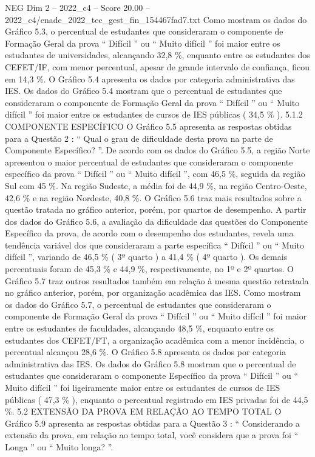 \begin{textsample}{NEG Dim 2 – 2022\_c4 – Score 20.00 – 2022\_c4/enade\_2022\_tec\_gest\_fin\_154467fad7.txt}
Como mostram os dados do Gráfico 5.3, o percentual de estudantes que consideraram o componente de Formação Geral da prova “ Difícil ” ou “ Muito difícil ” foi maior entre os estudantes de universidades, alcançando 32,8 \%, enquanto entre os estudantes dos CEFET/IF, com menor percentual, apesar de grande intervalo de confiança, ficou em 14,3 \%.
O Gráfico 5.4 apresenta os dados por categoria administrativa das IES.
Os dados do Gráfico 5.4 mostram que o percentual de estudantes que consideraram o componente de Formação Geral da prova “ Difícil ” ou “ Muito difícil ” foi maior entre os estudantes de cursos de IES públicas ( 34,5 \% ). 5.1.2 COMPONENTE ESPECÍFICO O Gráfico 5.5 apresenta as respostas obtidas para a Questão 2 : “ Qual o grau de dificuldade desta prova na parte de Componente Específico? ”.
De acordo com os dados do Gráfico 5.5, a região Norte apresentou o maior percentual de estudantes que consideraram o componente específico da prova “ Difícil ” ou “ Muito difícil ”, com 46,5 \%, seguida da região Sul com 45 \%.
Na região Sudeste, a média foi de 44,9 \%, na região Centro-Oeste, 42,6 \% e na região Nordeste, 40,8 \%.
O Gráfico 5.6 traz mais resultados sobre a questão tratada no gráfico anterior, porém, por quartos de desempenho.
A partir dos dados do Gráfico 5.6, a avaliação da dificuldade das questões do Componente Específico da prova, de acordo com o desempenho dos estudantes, revela uma tendência variável dos que consideraram a parte específica “ Difícil ” ou “ Muito difícil ”, variando de 46,5 \% ( 3º quarto ) a 41,4 \% ( 4º quarto ).
Os demais percentuais foram de 45,3 \% e 44,9 \%, respectivamente, no 1º e 2º quartos.
O Gráfico 5.7 traz outros resultados também em relação à mesma questão retratada no gráfico anterior, porém, por organização acadêmica das IES.
Como mostram os dados do Gráfico 5.7, o percentual de estudantes que consideraram o componente de Formação Geral da prova “ Difícil ” ou “ Muito difícil ” foi maior entre os estudantes de faculdades, alcançando 48,5 \%, enquanto entre os estudantes dos CEFET/FT, a organização acadêmica com a menor incidência, o percentual alcançou 28,6 \%.
O Gráfico 5.8 apresenta os dados por categoria administrativa das IES.
Os dados do Gráfico 5.8 mostram que o percentual de estudantes que consideraram o componente Específico da prova “ Difícil ” ou “ Muito difícil ” foi ligeiramente maior entre os estudantes de cursos de IES públicas ( 47,3 \% ), enquanto o percentual registrado em IES privadas foi de 44,5 \%. 5.2 EXTENSÃO DA PROVA EM RELAÇÃO AO TEMPO TOTAL O Gráfico 5.9 apresenta as respostas obtidas para a Questão 3 : “ Considerando a extensão da prova, em relação ao tempo total, você considera que a prova foi “ Longa ” ou “ Muito longa? ”.

\end{textsample}
